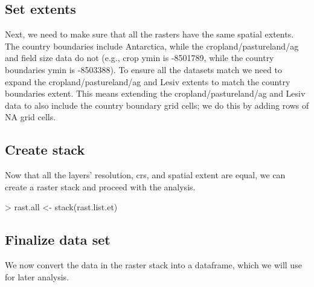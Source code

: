 \documentclass{article}
\begin{document}
\subsection{Set extents}

Next, we need to make sure that all the rasters have the same spatial extents. The country boundaries include Antarctica, while the cropland/pastureland/ag and field size data do not (e.g., crop ymin is -8501789, while the country boundaries ymin is -8503388). To ensure all the datasets match we need to expand the cropland/pastureland/ag and Lesiv extents to match the country boundaries extent. This means extending the cropland/pastureland/ag and Lesiv data to also include the country boundary grid cells; we do this by adding rows of NA grid cells.

\begin{Schunk}
\end{Schunk}

\subsection{Create stack}
Now that all the layers' resolution, crs, and spatial extent are equal, we can create a raster stack and proceed with the analysis.

\begin{Schunk}
\begin{Sinput}
> rast.all <- stack(rast.list.et)
\end{Sinput}
\end{Schunk}


\subsection{Finalize data set}

We now convert the data in the raster stack into a dataframe, which we will use for later analysis.
\end{document}
